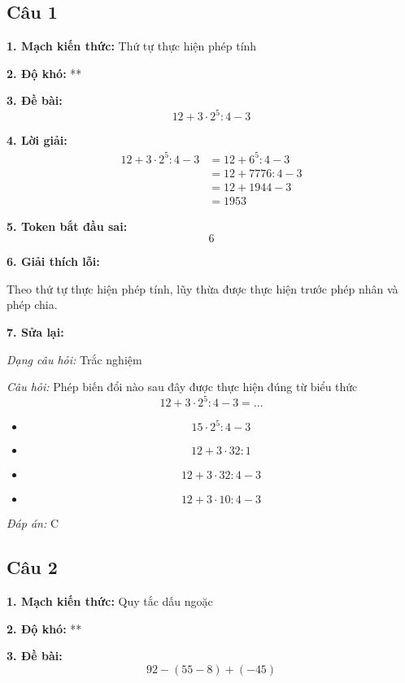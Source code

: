 \subsection*{Câu 1}

\noindent\textbf{1. Mạch kiến thức:} Thứ tự thực hiện phép tính

\noindent\textbf{2. Độ khó:} **

\noindent\textbf{3. Đề bài:}
\[
12+3\cdot 2^5:4-3
\]

\noindent\textbf{4. Lời giải:}
\begin{align*}
12+3\cdot 2^5:4-3
    &= 12+6^5:4-3 \\
    &= 12+7776:4-3 \\
    &= 12+1944-3 \\
    &= 1953
\end{align*}

\noindent\textbf{5. Token bắt đầu sai:}
\[
6
\]

\noindent\textbf{6. Giải thích lỗi:}

Theo thứ tự thực hiện phép tính, lũy thừa được thực hiện trước phép nhân và phép chia.

\noindent\textbf{7. Sửa lại:}

\textit{Dạng câu hỏi:} Trắc nghiệm

\textit{Câu hỏi:} Phép biến đổi nào sau đây được thực hiện đúng từ biểu thức
\[
12+3\cdot 2^5:4-3=...
\]

\begin{itemize}
    \item[A.] 
    \[
    15\cdot 2^5:4-3
    \]
    
    \item[B.] 
    \[
    12+3\cdot 32:1
    \]
    
    \item[C.] 
    \[
    12+3\cdot 32:4-3
    \]
    
    \item[D.] 
    \[
    12+3\cdot 10:4-3
    \]
\end{itemize}

\textit{Đáp án:} C

\subsection*{Câu 2}

\noindent\textbf{1. Mạch kiến thức:} Quy tắc dấu ngoặc

\noindent\textbf{2. Độ khó:} **

\noindent\textbf{3. Đề bài:}
\[
92-(55-8)+(-45)
\]

